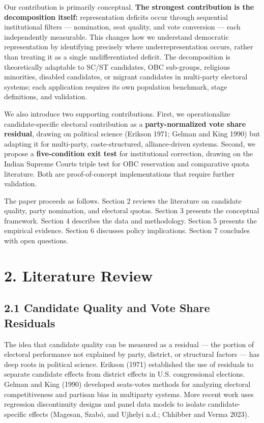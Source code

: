 \documentclass[
]{article}
\begin{document}
Our contribution is primarily conceptual. \textbf{The strongest contribution is the decomposition itself:} representation deficits occur through sequential institutional filters --- nomination, seat quality, and vote conversion --- each independently measurable. This changes how we understand democratic representation by identifying precisely where underrepresentation occurs, rather than treating it as a single undifferentiated deficit. The decomposition is theoretically adaptable to SC/ST candidates, OBC sub-groups, religious minorities, disabled candidates, or migrant candidates in multi-party electoral systems; each application requires its own population benchmark, stage definitions, and validation.

We also introduce two supporting contributions. First, we operationalize candidate-specific electoral contribution as a \textbf{party-normalized vote share residual}, drawing on political science (Erikson 1971; Gelman and King 1990) but adapting it for multi-party, caste-structured, alliance-driven systems. Second, we propose a \textbf{five-condition exit test} for institutional correction, drawing on the Indian Supreme Court\textquotesingle s triple test for OBC reservation and comparative quota literature. Both are proof-of-concept implementations that require further validation.

The paper proceeds as follows. Section 2 reviews the literature on candidate quality, party nomination, and electoral quotas. Section 3 presents the conceptual framework. Section 4 describes the data and methodology. Section 5 presents the empirical evidence. Section 6 discusses policy implications. Section 7 concludes with open questions.

\section{2. Literature Review}\label{2-literature-review}

\subsection{2.1 Candidate Quality and Vote Share Residuals}\label{21-candidate-quality-and-vote-share-residuals}

The idea that candidate quality can be measured as a residual --- the portion of electoral performance not explained by party, district, or structural factors --- has deep roots in political science. Erikson (1971) established the use of residuals to separate candidate effects from district effects in U.S. congressional elections. Gelman and King (1990) developed seats-votes methods for analyzing electoral competitiveness and partisan bias in multiparty systems. More recent work uses regression discontinuity designs and panel data models to isolate candidate-specific effects (Magesan, Szabó, and Ujhelyi n.d.; Chhibber and Verma 2023).
\end{document}
